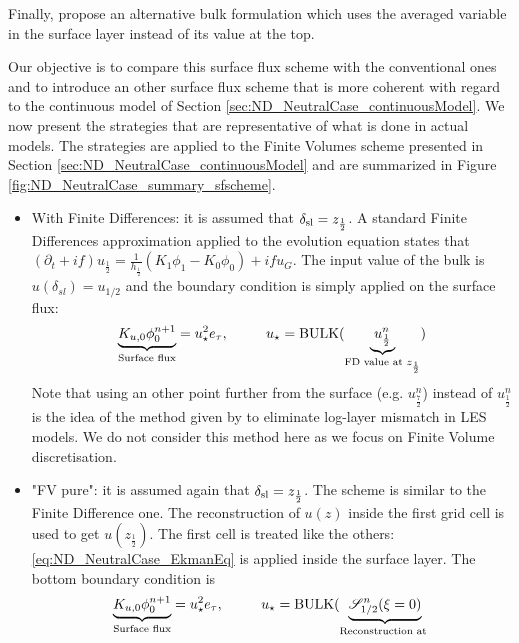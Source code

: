 Finally, \cite{nishizawa_surface_2018} propose an alternative
bulk formulation which uses the averaged variable in the surface layer
instead of its value at the top.
%
\par
Our objective is to compare this surface flux scheme with the
conventional ones
and to introduce an other surface flux scheme that is more coherent
with regard to the continuous model of Section
\ref{sec:ND_NeutralCase_continuousModel}.
We now present the strategies that are representative of
what is done in actual models. The strategies are applied to
the Finite Volumes scheme presented in Section
\ref{sec:ND_NeutralCase_continuousModel} and are
summarized in Figure \ref{fig:ND_NeutralCase_summary_sfscheme}.
  \begin{itemize}
	  \item With Finite Differences:
		  it is assumed that
		  $\delta_{\rm sl} = z_{\frac{1}{2}}$.
		A standard Finite Differences approximation applied to
		  the evolution equation states that
		  $(\partial_t+if) u_{\frac{1}{2}}
		  =\frac{1}{h_{\frac{1}{2}}}(K_1\phi_1 - K_0\phi_0)
		  + if u_G$.
		  The input value of the bulk is
		  $u(\delta_{sl}) = u_{1/2}$ and the boundary
		  condition is simply applied on the surface flux:
		\begin{equation}
		\underbrace{K_{u,0} \phi_0^{n+1}}_{\text{Surface flux}}
		= u_\star^2 e_\tau, ~~~~~~~~
			u_\star = {\rm BULK}(
			\underbrace{u_{\frac{1}{2}}^{n}}_{
				\text{FD value at }
			z_{\frac{1}{2}}})
		\end{equation}
		  Note that using an other point further from
		  the surface (e.g. $u_{\frac{7}{2}}^n$) instead
		  of $u_{\frac{1}{2}}^n$ is the idea of the method
		  given by \citep{kawai_wall-modeling_2012}
		  to eliminate log-layer mismatch in LES models.
		  We do not consider this method here as we focus
		  on Finite Volume discretisation.
	  \item "FV pure": it is assumed again that
		  $\delta_{\rm sl} = z_{\frac{1}{2}}$.
		  The scheme is similar to the Finite Difference one.
	    The reconstruction of $u(z)$ inside the first grid cell
		  is used to get $u(z_{\frac{1}{2}})$.
		  The first cell is treated like the others:
		  \eqref{eq:ND_NeutralCase_EkmanEq} is
		  applied inside the surface layer.
	The bottom boundary condition is
	\begin{equation}
		\underbrace{K_{u,0} \phi_0^{n+1}}_{\text{Surface flux}}
		= u_\star^2 e_\tau, ~~~~~~~~
			u_\star = {\rm BULK}(
			\underbrace{{\cal S}_{1/2}^{n}(\xi=0)}_{
				\text{Reconstruction at }
}
\end{equation}
\end{itemize}
